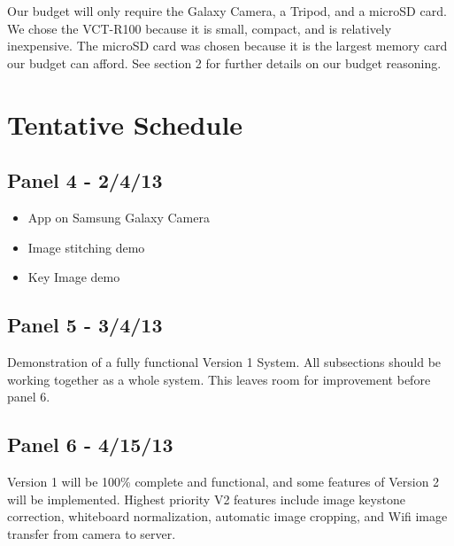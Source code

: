 \documentclass[]{article}
\begin{document}
	Our budget will only require the Galaxy Camera, a Tripod, and a microSD card. We chose the VCT-R100 because it is small, compact, and is relatively inexpensive. The microSD card was chosen because it is the largest memory card our budget can afford. See section 2 for further details on our budget reasoning.
	
	\section{Tentative Schedule}
\subsection*{Panel 4 - 2/4/13}
\begin{itemize}
\item{App on Samsung Galaxy Camera}
\item{Image stitching demo}
\item{Key Image demo}
\end{itemize}

\subsection*{Panel 5 - 3/4/13}
Demonstration of a fully functional Version 1 System.  All subsections should be working together as a whole system.  This leaves room for improvement before panel 6.

\subsection*{Panel 6 - 4/15/13}
Version 1 will be 100\% complete and functional, and some features of Version 2 will be implemented.  Highest priority V2 features include image keystone correction, whiteboard normalization, automatic image cropping, and Wifi image transfer from camera to server.	
			
\end{document}
